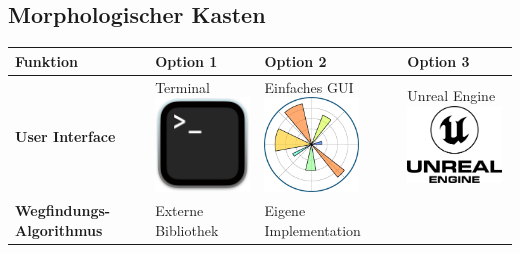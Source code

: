 \documentclass[../main.tex]{subfiles}
\begin{document}
\newpage
\subsection{Morphologischer Kasten}


\begin{table}[htbp!]
    \centering
    \begin{tabularx}{\textwidth}{| X | Y | Y | Y |}
        \hline

        \textbf{Funktion} & \textbf{Option 1} & \textbf{Option 2} & \textbf{Option 3} \\ \hline
        
        \textbf{User Interface} &     
        Terminal \newline
        \includegraphics[width=2.5cm]{img/simulation/morphologischer-kasten/terminal.png}
        &
        Einfaches GUI \newline
        \includegraphics[width=2.5cm]{img/simulation/morphologischer-kasten/simple-gui.png}
        &
        Unreal Engine \newline
        \includegraphics[width=2.5cm]{img/simulation/morphologischer-kasten/unreal-engine-logo.png}
        \\ \hline
        
        \textbf{Wegfindungs-Algorithmus}  &
        Externe Bibliothek &
        Eigene Implementation &
        \\ \hline
        

\end{tabularx}
\end{table}
\end{document}
